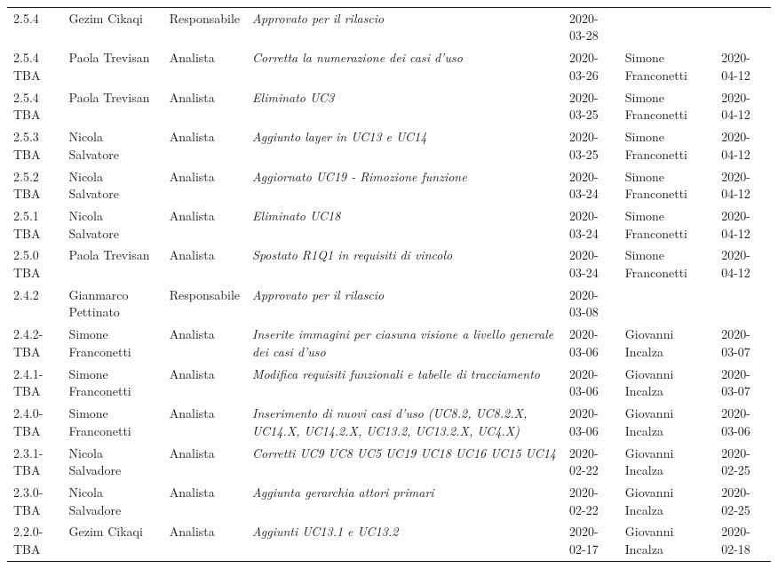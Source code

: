 \begin{longtable}{|p{1.7cm}|p{2cm}|p{2.5cm}|p{3cm}|p{1.7cm}|p{2cm}|p{2.3cm}|}
    2.5.4 & Gezim Cikaqi & Responsabile & \small{\textit{Approvato per il rilascio}} & 2020-03-28 & &\\
    2.5.4 TBA& Paola Trevisan & Analista & \small{\textit{Corretta la numerazione dei casi d'uso}} & 2020-03-26 & Simone Franconetti & 2020-04-12\\
    2.5.4 TBA& Paola Trevisan & Analista & \small{\textit{Eliminato UC3}} & 2020-03-25 & Simone Franconetti & 2020-04-12\\
    2.5.3 TBA& Nicola Salvatore & Analista & \small{\textit{Aggiunto layer in UC13 e UC14}} & 2020-03-25 & Simone Franconetti & 2020-04-12\\
    2.5.2 TBA& Nicola Salvatore & Analista & \small{\textit{Aggiornato UC19 - Rimozione funzione}} & 2020-03-24 & Simone Franconetti & 2020-04-12\\
    2.5.1 TBA& Nicola Salvatore & Analista & \small{\textit{Eliminato UC18}} & 2020-03-24 & Simone Franconetti & 2020-04-12\\
    2.5.0 TBA& Paola Trevisan& Analista & \small{\textit{Spostato R1Q1 in requisiti di vincolo}} & 2020-03-24 & Simone Franconetti & 2020-04-12\\
    2.4.2 & Gianmarco Pettinato & Responsabile & \small{\textit{Approvato per il rilascio}} & 2020-03-08 & &\\
    2.4.2-TBA & Simone Franconetti & Analista & \small{\textit{Inserite immagini per ciasuna visione a livello generale dei casi d'uso}} & 2020-03-06 & Giovanni Incalza & 2020-03-07 \\
    2.4.1-TBA & Simone Franconetti & Analista & \small{\textit{Modifica requisiti funzionali e tabelle di tracciamento}} & 2020-03-06 & Giovanni Incalza & 2020-03-07 \\
    2.4.0-TBA & Simone Franconetti & Analista & \small{\textit{Inserimento di nuovi casi d'uso (UC8.2, UC8.2.X, UC14.X, UC14.2.X, UC13.2, UC13.2.X, UC4.X)}} & 2020-03-06 & Giovanni Incalza & 2020-03-06 \\
    2.3.1-TBA & Nicola Salvadore & Analista & \small{\textit{Corretti UC9 UC8 UC5 UC19 UC18 UC16 UC15 UC14}} & 2020-02-22 & Giovanni Incalza & 2020-02-25 \\
    2.3.0-TBA & Nicola Salvadore & Analista & \small{\textit{Aggiunta gerarchia attori primari}} & 2020-02-22 & Giovanni Incalza & 2020-02-25 \\
    2.2.0-TBA & Gezim Cikaqi & Analista & \small{\textit{Aggiunti UC13.1 e UC13.2}} & 2020-02-17 & Giovanni Incalza & 2020-02-18 \\

\end{longtable}
